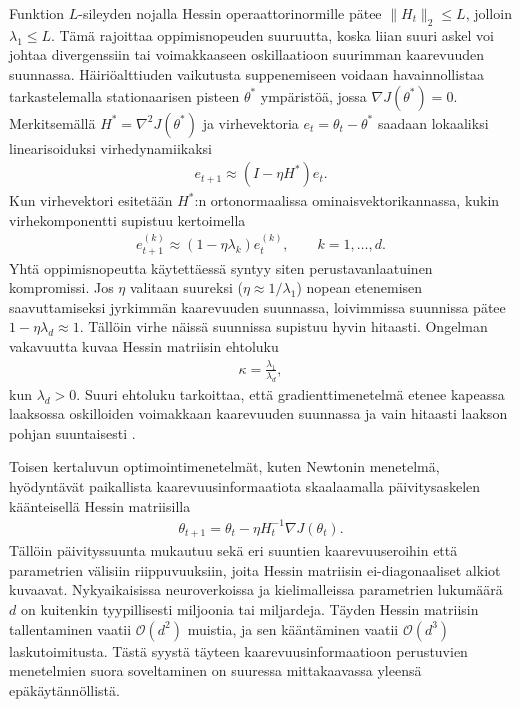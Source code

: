 Funktion \(L\)-sileyden nojalla Hessin operaattorinormille pätee
\(\|H_t\|_2\le L\), jolloin \(\lambda_1\le L\). Tämä rajoittaa
oppimisnopeuden suuruutta, koska liian suuri askel voi johtaa divergenssiin tai
voimakkaaseen oskillaatioon suurimman kaarevuuden suunnassa.
Häiriöalttiuden vaikutusta suppenemiseen voidaan havainnollistaa
tarkastelemalla stationaarisen pisteen \(\theta^\ast\) ympäristöä, jossa
\(\nabla J(\theta^\ast)=0\). Merkitsemällä
\(H^\ast=\nabla^2J(\theta^\ast)\) ja virhevektoria
\(e_t=\theta_t-\theta^\ast\) saadaan lokaaliksi linearisoiduksi
virhedynamiikaksi
\begin{align*}
  e_{t+1}
  \approx
  (I-\eta H^\ast)e_t.
\end{align*}
Kun virhevektori esitetään \(H^\ast\):n ortonormaalissa
ominaisvektorikannassa, kukin virhekomponentti supistuu kertoimella
\begin{align*}
  e_{t+1}^{(k)}
  \approx
  (1-\eta\lambda_k)e_t^{(k)},
  \qquad
  k=1,\dots,d.
\end{align*}
Yhtä oppimisnopeutta käytettäessä syntyy siten perustavanlaatuinen
kompromissi. Jos \(\eta\) valitaan suureksi
(\(\eta \approx 1/\lambda_1\)) nopean etenemisen saavuttamiseksi
jyrkimmän kaarevuuden suunnassa, loivimmissa suunnissa pätee
\(1-\eta\lambda_d \approx 1\). Tällöin virhe näissä suunnissa supistuu
hyvin hitaasti. Ongelman vakavuutta kuvaa Hessin matriisin ehtoluku
\begin{align*}
  \kappa
  =
  \frac{\lambda_1}{\lambda_d},
\end{align*}
kun \(\lambda_d>0\). Suuri ehtoluku tarkoittaa, että
gradienttimenetelmä etenee kapeassa laaksossa oskilloiden voimakkaan
kaarevuuden suunnassa ja vain hitaasti laakson pohjan suuntaisesti
\cite{nocedal2006numerical}.

Toisen kertaluvun optimointimenetelmät, kuten Newtonin menetelmä,
hyödyntävät paikallista kaarevuusinformaatiota skaalaamalla
päivitysaskelen käänteisellä Hessin matriisilla
\begin{align*}
  \theta_{t+1}
  =
  \theta_t - \eta H_t^{-1} \nabla J(\theta_t).
\end{align*}
Tällöin päivityssuunta mukautuu sekä eri suuntien
kaarevuuseroihin että parametrien välisiin riippuvuuksiin, joita Hessin
matriisin ei-diagonaaliset alkiot kuvaavat. Nykyaikaisissa
neuroverkoissa ja kielimalleissa parametrien lukumäärä \(d\) on kuitenkin
tyypillisesti miljoonia tai miljardeja. Täyden Hessin matriisin
tallentaminen vaatii \(\mathcal{O}(d^2)\) muistia, ja sen kääntäminen
vaatii \(\mathcal{O}(d^3)\) laskutoimitusta. Tästä syystä täyteen
kaarevuusinformaatioon perustuvien menetelmien suora soveltaminen on
suuressa mittakaavassa yleensä epäkäytännöllistä.

